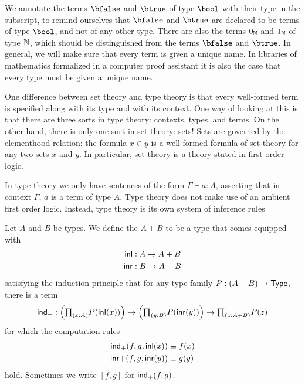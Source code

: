 \begin{rmk}
  We annotate the terms $\bfalse$ and $\btrue$ of type $\bool$ with their type in the subscript, to remind ourselves that $\bfalse$ and $\btrue$ are declared to be terms of type $\bool$, and not of any other type. There are also the terms $0_\mathbb{N}$ and $1_\mathbb{N}$ of type $\mathbb{N}$, which should be distinguished from the terms $\bfalse$ and $\btrue$. In general, we will make sure that every term is given a unique name. In libraries of mathematics formalized in a computer proof assistant it is also the case that every type must be given a unique name.
  
  One difference between set theory and type theory is that every well-formed term is specified along with its type and with its context. One way of looking at this is that there are three sorts in type theory: contexts, types, and terms. On the other hand, there is only one sort in set theory: sets! Sets are governed by the elementhood relation: the formula $x\in y$ is a well-formed formula of set theory for any two sets $x$ and $y$. In particular, set theory is a theory stated in first order logic.

  In type theory we only have sentences of the form $\Gamma \vdash a : A$, asserting that in context $\Gamma$, $a$ is a term of type $A$. Type theory does not make use of an ambient first order logic. Instead, type theory is its own system of inference rules
\end{rmk}

\begin{defn}
Let $A$ and $B$ be types. We define the  $A+B$ to be a type that comes equipped with
\begin{align*}
{\mathsf{inl}} & : A \to A+B \\
{\mathsf{inr}} & : B \to A+B
\end{align*}
satisfying the induction principle that for any type family $P:(A+B)\to\mathsf{Type}$, there is a term
\begin{equation*}
\ind{+} : \Big(\prd{x:A}P(\inl(x))\Big)\to\Big(\prd{y:B}P(\inr(y))\Big)\to\prd{z:A+B}P(z)
\end{equation*}
for which the computation rules
\begin{align*}
\mathsf{ind}_{+}(f,g,{\mathsf{inl}}(x)) & \equiv f(x) \\
{\mathsf{inr}}{+}(f,g,{\mathsf{inr}}(y)) & \equiv g(y)
\end{align*}
hold. Sometimes we write $[f,g]$ for $\mathsf{ind}_{+}(f,g)$.
\end{defn}

